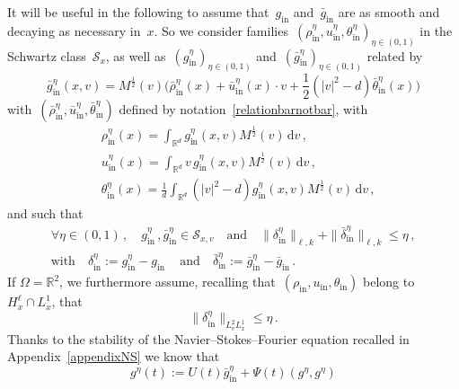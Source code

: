 \documentclass[11pt]{article}
\theoremstyle{definition}
\numberwithin{equation}{section}
\numberwithin{figure}{section}
\numberwithin{table}{section}
\newcommand*{\dd}{\mathrm{d}}
\newcommand*{\dv}{\dd v}
\newcommand*\R {\mathbb{R}}
\DeclareMathOperator{\inn}{in}
\let\oldforall\forall
\renewcommand*{\forall}{\mathrel{\oldforall}}
\begin{document}
It will be useful in the following to assume that~$ g_{\inn} $ and~$ \bar g_{\inn} $ are as smooth and decaying as necessary in~$x$. So we consider families~$ (\rho^\eta_{\inn}, u^\eta_{\inn},\theta^\eta_{\inn})_{\eta \in (0,1)} $ in the Schwartz class~$ {\mathcal S}_x$, as well as~$ (g^\eta_{\inn})_{\eta \in (0,1)} $ and~$ (\bar g^\eta_{\inn})_{\eta \in (0,1)} $ related by
\begin{equation}\label{bargeta}
\bar g^\eta_{\inn}(x,v)=M^\frac12(v)\Big(\bar \rho^\eta_{\inn} (x) + \bar u^\eta_{\inn}(x) \cdot v + \frac12(|v|^2- d) \bar \theta^\eta_{\inn} (x)\Big)
\end{equation}
with~$ (\bar \rho^\eta_{\inn}, \bar u^\eta_{\inn},\bar\theta^\eta_{\inn}) $ defined by notation~\eqref{relationbarnotbar}, with
\begin{equation}\label{bargetageta}
\begin{aligned}
&\rho^\eta_{\inn}(x)= \int_{\R^d} g^\eta_{\inn} (x,v)M^\frac12 (v) \, \dv \,, \\
&u^\eta_{\inn} (x)= \int_{\R^d} v\, g^\eta_{\inn} (x,v)M^\frac12 (v) \, \dv\,, \\
&\theta^\eta_{\inn} (x)= \frac{1}{d} \int_{\R^d} (|v|^2-d) g^\eta_{\inn} (x,v)M^\frac12 (v) \, \dv \,,
\end{aligned}
\end{equation}
and such that
\begin{equation}\label{deltaineta}
\begin{gathered}
\forall \eta \in (0,1) \,, \quad g^\eta_{\inn} \,, \bar g^\eta_{\inn} \in {\mathcal S}_{x,v} \quad \text{and} \quad \| \delta^\eta_{\inn} \|_{\ell,k} +\| \bar\delta^\eta_{\inn} \|_{\ell,k} \leq \eta \,, \\
\text{with} \quad \delta^\eta_{\inn} := g^\eta_{\inn} - g _{\inn}
\, \quad \text{and} \quad \bar \delta^\eta_{\inn} :=\bar g^\eta_{\inn} - \bar g _{\inn} \,.
\end{gathered}
\end{equation}
If $\Omega = \R^2$, we furthermore assume, recalling that~$(\rho_{\inn}, u_{\inn},\theta_{\inn})$ belong to~$H^\ell_x \cap L^1_x$, that
\begin{equation}\label{deltainetaR2}
\| \delta^\eta_{\inn} \|_{L^2_vL^1_x} \le \eta \,.
\end{equation}
Thanks to the stability of the Navier--Stokes--Fourier equation recalled in Appendix~\ref{appendixNS} we know that
\begin{equation}\label{eqgeta}
g^\eta(t) :=U (t)\bar g^\eta_{\inn} + \Psi(t) (g^\eta,g^\eta)
\end{equation}
\end{document}

